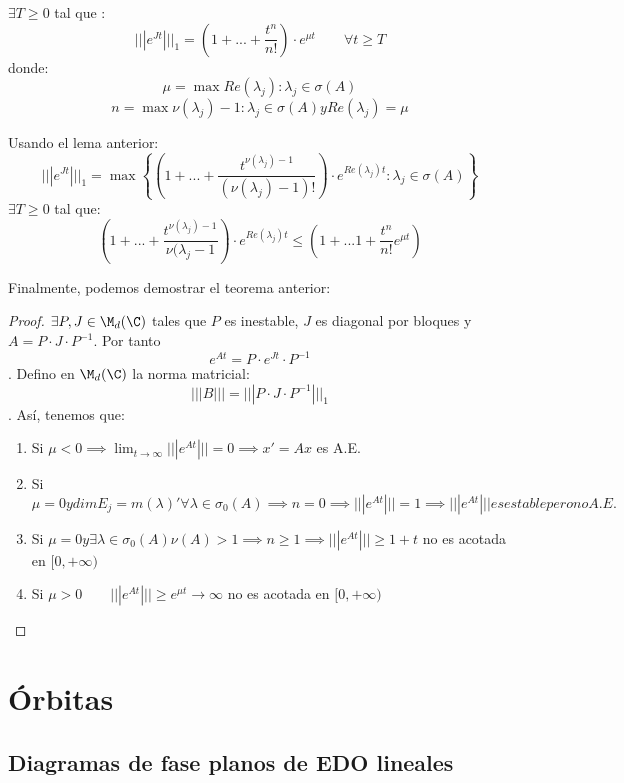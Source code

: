 \begin{lema}
$\exists T \geq 0 $ tal que :
$$|||e^{Jt}|||_1=\left(1+...+\frac{t^n}{n!}\right)\cdot e^{\mu t} \qquad \forall t \geq T$$
donde:
$$\mu=\max{Re(\lambda_j):\lambda_j\in \sigma(A)}$$
$$n=\max{\nu(\lambda_j)-1 : \lambda_j\in \sigma(A) y Re(\lambda_j)=\mu}$$
\end{lema}

Usando el lema anterior:
\begin{equation}
|||e^{Jt}|||_1=\max
\left\{ {\left(
1+...+\frac{t^{\nu(\lambda_j)-1}}{(\nu (\lambda_j)-1)!}
\right) }
\cdot e^{Re(\lambda_j)t} : \lambda_j \in \sigma(A) \right\}
\tag{cosarara}\label{cosarara}
\end{equation}
$\exists T \geq 0$ tal que:
\begin{equation}
(1+...+\frac{t^{\nu(\lambda_j)-1}}{\nu(\lambda_j - 1})\cdot e^{Re(\lambda_j)t} \leq (1+...1+\frac{t^n}{n!}e^{\mu t})
\end{equation}

Finalmente, podemos demostrar el teorema anterior:

\begin{proof}
$\exists P, J \in \M_d(\C)$ tales que $P$ es inestable, $J$ es diagonal por bloques y $A=P\cdot J \cdot P^{-1}$. Por tanto $$e^{At}=P\cdot e^{Jt} \cdot P^{-1}$$.
Defino en $\M_d(\C)$ la norma matricial:
$$|||B|||=|||P\cdot J \cdot P^{-1}|||_1$$.
Así, tenemos que:
\begin{enumerate}
\item Si $\mu < 0 \implies \lim_{t\to\infty}|||e^{At}|||=0\implies x'=Ax$ es A.E.
\item Si $\mu = 0 y dimE_j=m(\lambda)' \forall \lambda \in \sigma_0(A)\implies n=0 \implies |||e^{At}|||=1\implies|||e^{At}||| es estable pero no A.E.$
\item Si $\mu = 0 y \exists \lambda \in \sigma_0(A) \nu(A)>1 \implies n\geq 1\implies |||e^{At}|||\geq 1+t$ no es acotada en $[0,+\infty)$
\item Si $\mu > 0 \qquad |||e^{At}|||\geq e^{\mu t}\to \infty$ no es acotada en $[0,+\infty)$
\end{enumerate}
\end{proof}


\section{Órbitas}
\subsection{Diagramas de fase planos de EDO lineales}

